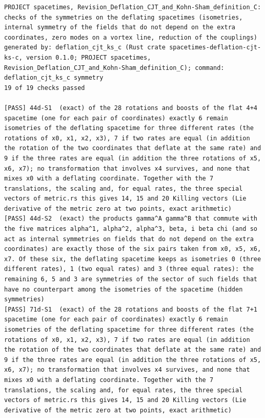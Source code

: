 \documentclass[
  10pt,
]{article}
\begin{document}
\begin{verbatim}
PROJECT spacetimes, Revision_Deflation_CJT_and_Kohn-Sham_definition_C: checks of the symmetries on the deflating spacetimes (isometries, internal symmetry of the fields that do not depend on the extra coordinates, zero modes on a vortex line, reduction of the couplings)
generated by: deflation_cjt_ks_c (Rust crate spacetimes-deflation-cjt-ks-c, version 0.1.0; PROJECT spacetimes, Revision_Deflation_CJT_and_Kohn-Sham_definition_C); command: deflation_cjt_ks_c symmetry
19 of 19 checks passed

[PASS] 44d-S1  (exact) of the 28 rotations and boosts of the flat 4+4 spacetime (one for each pair of coordinates) exactly 6 remain isometries of the deflating spacetime for three different rates (the rotations of x0, x1, x2, x3), 7 if two rates are equal (in addition the rotation of the two coordinates that deflate at the same rate) and 9 if the three rates are equal (in addition the three rotations of x5, x6, x7); no transformation that involves x4 survives, and none that mixes x0 with a deflating coordinate. Together with the 7 translations, the scaling and, for equal rates, the three special vectors of metric.rs this gives 14, 15 and 20 Killing vectors (Lie derivative of the metric zero at two points, exact arithmetic)
[PASS] 44d-S2  (exact) the products gamma^A gamma^B that commute with the five matrices alpha^1, alpha^2, alpha^3, beta, i beta chi (and so act as internal symmetries on fields that do not depend on the extra coordinates) are exactly those of the six pairs taken from x0, x5, x6, x7. Of these six, the deflating spacetime keeps as isometries 0 (three different rates), 1 (two equal rates) and 3 (three equal rates): the remaining 6, 5 and 3 are symmetries of the sector of such fields that have no counterpart among the isometries of the spacetime (hidden symmetries)
[PASS] 71d-S1  (exact) of the 28 rotations and boosts of the flat 7+1 spacetime (one for each pair of coordinates) exactly 6 remain isometries of the deflating spacetime for three different rates (the rotations of x0, x1, x2, x3), 7 if two rates are equal (in addition the rotation of the two coordinates that deflate at the same rate) and 9 if the three rates are equal (in addition the three rotations of x5, x6, x7); no transformation that involves x4 survives, and none that mixes x0 with a deflating coordinate. Together with the 7 translations, the scaling and, for equal rates, the three special vectors of metric.rs this gives 14, 15 and 20 Killing vectors (Lie derivative of the metric zero at two points, exact arithmetic)

\end{verbatim}
\end{document}
